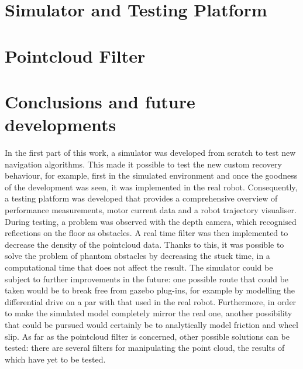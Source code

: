 \documentclass{Configuration_Files/PoliMi3i_thesis}
\begin{document}
\chapter{Simulator and Testing Platform}
\label{ch:sim_test}


\chapter{Pointcloud Filter}
\label{ch:pcl}



\chapter{Conclusions and future developments}
\label{ch:conclusions}%
In the first part of this work, a simulator was developed from scratch to test new navigation algorithms. This made it possible to test the new custom recovery behaviour, for example, first in the simulated environment and once the goodness of the development was seen, it was implemented in the real robot. Consequently, a testing platform was developed that provides a comprehensive overview of performance measurements, motor current data and a robot trajectory visualiser. During testing, a problem was observed with the depth camera, which recognised reflections on the floor as obstacles. A real time filter was then implemented to decrease the density of the pointcloud data. Thanks to this, it was possible to solve the problem of phantom obstacles by decreasing the stuck time, in a computational time that does not affect the result. 
The simulator could be subject to further improvements in the future: one possible route that could be taken would be to break free from gazebo plug-ins, for example by modelling the differential drive on a par with that used in the real robot. Furthermore, in order to make the simulated model completely mirror the real one, another possibility that could be pursued would certainly be to analytically model friction and wheel slip. As far as the pointcloud filter is concerned, other possible solutions can be tested: there are several filters for manipulating the point cloud, the results of which have yet to be tested.


\end{document}
